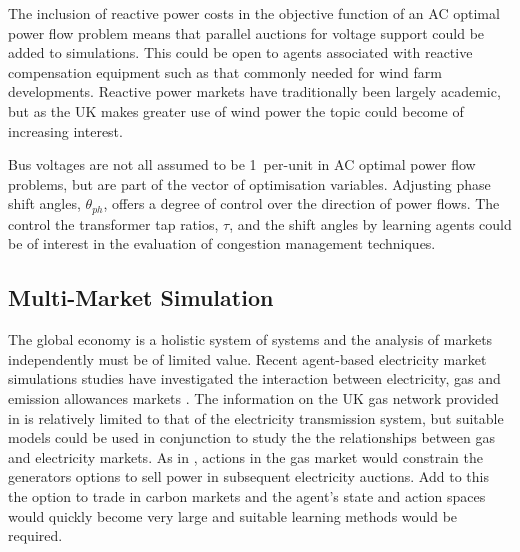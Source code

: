 The inclusion of reactive power costs in the objective function of an AC
optimal power flow problem means that parallel auctions for voltage support
could be added to simulations.  This could be open to agents associated with
reactive compensation equipment such as that commonly needed for wind farm
developments.  Reactive power markets have traditionally been largely
academic, but as the UK makes greater use of wind power the topic could
become of increasing interest.

Bus voltages are not all assumed to be 1~per-unit in AC optimal power flow
problems, but are part of the vector of optimisation variables.  Adjusting
phase shift angles, $\theta_{ph}$, offers a degree of control over the
direction of power flows.  The control the transformer tap ratios, $\tau$, and
the shift angles by learning agents could be of interest in the evaluation of
congestion management techniques.

\subsection{Multi-Market Simulation}
The global economy is a holistic system of
systems and the analysis of markets independently must be of limited value.
Recent agent-based electricity market simulations studies have investigated the
interaction between electricity, gas and emission allowances markets
\cite{krause:gas,wang:09}.
The information on the UK gas network provided in  is
relatively limited to that of the electricity transmission system, but
suitable models could be used in conjunction to study the the relationships
between gas and electricity markets.  As in , actions in the
gas market would constrain the generators options to sell power in subsequent
electricity auctions.  Add to this the option to trade in carbon markets and
the agent's state and action spaces would quickly become very large and
suitable learning methods would be required.

